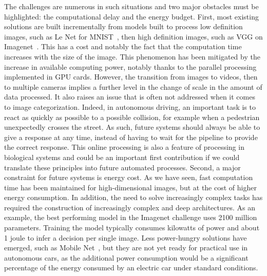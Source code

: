 \documentclass[default]{sn-jnl}%
\theoremstyle{thmstyleone}%
\theoremstyle{thmstyletwo}%
\theoremstyle{thmstylethree}%
\begin{document}
The challenges are numerous in such situations and two major obstacles must be highlighted: the computational delay and the energy budget. First, most existing solutions are built incrementally from models built to process low definition images, such as Le Net for MNIST~\citep{lecun1998gradient}, then high definition images, such as VGG on Imagenet~\citep{Simonyan:2014cmh}. This has a cost and notably the fact that the computation time increases with the size of the image. This phenomenon has been mitigated by the increase in available computing power, notably thanks to the parallel processing implemented in GPU cards. However, the transition from images to videos, then to multiple cameras implies a further level in the change of scale in the amount of data processed. It also raises an issue that is often not addressed when it comes to image categorization. Indeed, in autonomous driving, an important task is to react as quickly as possible to a possible collision, for example when a pedestrian unexpectedly crosses the street. As such, future systems should always be able to give a response at any time, instead of having to wait for the pipeline to provide the correct response. This online processing is also a feature of processing in biological systems and could be an important first contribution if we could translate these principles into future automated processes. %
Second, a major constraint for future systems is energy cost. As we have seen, fast computation time has been maintained for high-dimensional images, but at the cost of higher energy consumption. In addition, the need to solve increasingly complex tasks has required the construction of increasingly complex and deep architectures. As an example, the best performing model in the Imagenet challenge uses 2100 million parameters. Training the model typically consumes kilowatts of power and about 1 joule to infer a decision per single image. Less power-hungry solutions have emerged, such as Mobile Net~\citep{howard_searching_2019}, but they are not yet ready for practical use in autonomous cars, as the additional power consumption would be a significant percentage of the energy consumed by an electric car under standard conditions.
\end{document}
